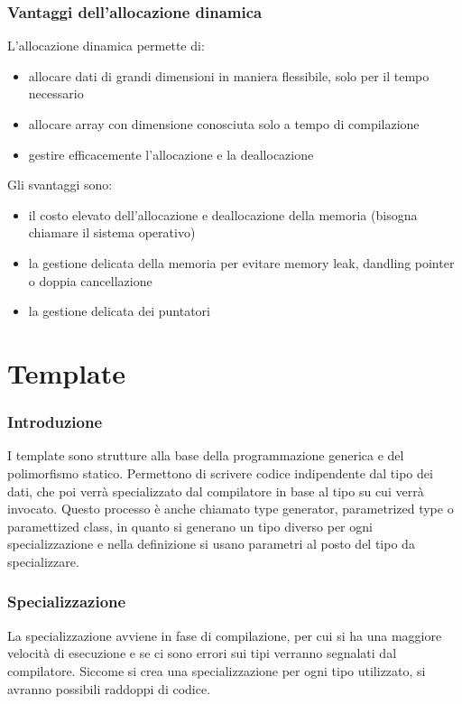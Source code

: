 \documentclass[a4paper]{article}
\begin{document}
\subsubsection*{Vantaggi dell'allocazione dinamica}
L'allocazione dinamica permette di:
\begin{itemize}
	\item allocare dati di grandi dimensioni in maniera flessibile, solo per il tempo necessario
	\item allocare array con dimensione conosciuta solo a tempo di compilazione
	\item gestire efficacemente l'allocazione e la deallocazione
\end{itemize}
Gli svantaggi sono:
\begin{itemize}
	\item il costo elevato dell'allocazione e deallocazione della memoria (bisogna chiamare il sistema operativo)
	\item la gestione delicata della memoria per evitare memory leak, dandling pointer o doppia cancellazione
	\item la gestione delicata dei puntatori
\end{itemize}

\newpage

\section{Template}
\subsubsection*{Introduzione}
I template sono strutture alla base della programmazione generica e del polimorfismo statico. Permettono di scrivere codice
indipendente dal tipo dei dati, che poi verrà specializzato dal compilatore in base al tipo su cui verrà invocato. Questo processo
è anche chiamato type generator, parametrized type o paramettized class, in quanto si generano un tipo diverso per ogni
specializzazione e nella definizione si usano parametri al posto del tipo da specializzare.

\subsubsection*{Specializzazione}
La specializzazione avviene in fase di compilazione, per cui si ha una maggiore velocità di esecuzione e se ci sono errori sui
tipi verranno segnalati dal compilatore. Siccome si crea una specializzazione per ogni tipo utilizzato, si avranno possibili
raddoppi di codice.
\end{document}
